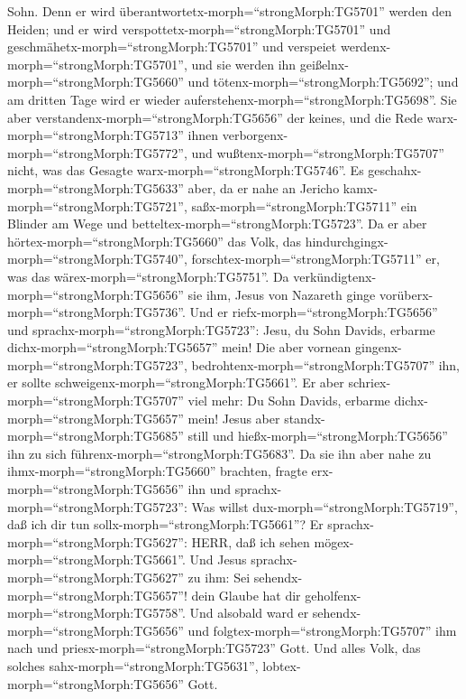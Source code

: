Sohn.  Denn er wird
überantwortetx-morph=``strongMorph:TG5701'' werden den Heiden; und er
wird verspottetx-morph=``strongMorph:TG5701'' und
geschmähetx-morph=``strongMorph:TG5701'' und verspeiet
werdenx-morph=``strongMorph:TG5701'',  und sie werden ihn
geißelnx-morph=``strongMorph:TG5660'' und
tötenx-morph=``strongMorph:TG5692''; und am dritten Tage wird er wieder
auferstehenx-morph=``strongMorph:TG5698''.  Sie aber
verstandenx-morph=``strongMorph:TG5656'' der keines, und die Rede
warx-morph=``strongMorph:TG5713'' ihnen
verborgenx-morph=``strongMorph:TG5772'', und
wußtenx-morph=``strongMorph:TG5707'' nicht, was das Gesagte
warx-morph=``strongMorph:TG5746''.  Es
geschahx-morph=``strongMorph:TG5633'' aber, da er nahe an Jericho
kamx-morph=``strongMorph:TG5721'', saßx-morph=``strongMorph:TG5711'' ein
Blinder am Wege und betteltex-morph=``strongMorph:TG5723''.
 Da er aber hörtex-morph=``strongMorph:TG5660'' das Volk,
das hindurchgingx-morph=``strongMorph:TG5740'',
forschtex-morph=``strongMorph:TG5711'' er, was das
wärex-morph=``strongMorph:TG5751''.  Da
verkündigtenx-morph=``strongMorph:TG5656'' sie ihm, Jesus von Nazareth
ginge vorüberx-morph=``strongMorph:TG5736''.  Und er
riefx-morph=``strongMorph:TG5656'' und
sprachx-morph=``strongMorph:TG5723'': Jesu, du Sohn Davids, erbarme
dichx-morph=``strongMorph:TG5657'' mein!  Die aber vornean
gingenx-morph=``strongMorph:TG5723'',
bedrohtenx-morph=``strongMorph:TG5707'' ihn, er sollte
schweigenx-morph=``strongMorph:TG5661''. Er aber
schriex-morph=``strongMorph:TG5707'' viel mehr: Du Sohn Davids, erbarme
dichx-morph=``strongMorph:TG5657'' mein!  Jesus aber
standx-morph=``strongMorph:TG5685'' still und
hießx-morph=``strongMorph:TG5656'' ihn zu sich
führenx-morph=``strongMorph:TG5683''. Da sie ihn aber nahe zu
ihmx-morph=``strongMorph:TG5660'' brachten, fragte
erx-morph=``strongMorph:TG5656'' ihn  und
sprachx-morph=``strongMorph:TG5723'': Was willst
dux-morph=``strongMorph:TG5719'', daß ich dir tun
sollx-morph=``strongMorph:TG5661''? Er
sprachx-morph=``strongMorph:TG5627'': HERR, daß ich sehen
mögex-morph=``strongMorph:TG5661''.  Und Jesus
sprachx-morph=``strongMorph:TG5627'' zu ihm: Sei
sehendx-morph=``strongMorph:TG5657''! dein Glaube hat dir
geholfenx-morph=``strongMorph:TG5758''.  Und alsobald ward
er sehendx-morph=``strongMorph:TG5656'' und
folgtex-morph=``strongMorph:TG5707'' ihm nach und
priesx-morph=``strongMorph:TG5723'' Gott. Und alles Volk, das solches
sahx-morph=``strongMorph:TG5631'', lobtex-morph=``strongMorph:TG5656''
Gott.

